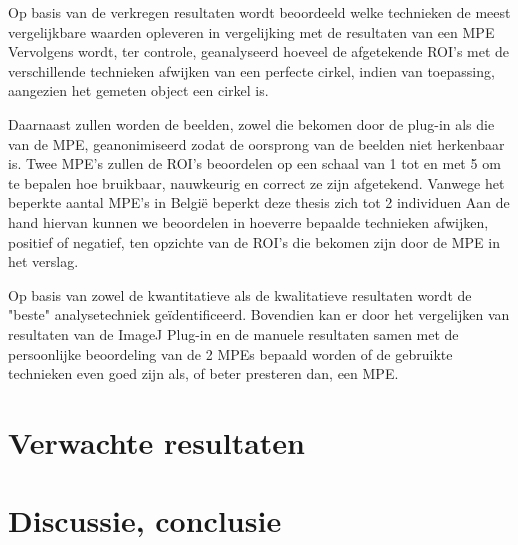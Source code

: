 \documentclass{hogent-article}
\begin{document}
Op basis van de verkregen resultaten wordt beoordeeld welke technieken de meest vergelijkbare waarden opleveren in vergelijking met de resultaten van een MPE Vervolgens wordt, ter controle,  geanalyseerd hoeveel de afgetekende ROI's met de verschillende technieken afwijken van een perfecte cirkel, indien van toepassing, aangezien het gemeten object  een cirkel is.

Daarnaast zullen worden de beelden, zowel die bekomen door de plug-in als die van de MPE, geanonimiseerd zodat de oorsprong van de beelden niet herkenbaar is. Twee MPE’s  zullen de ROI's beoordelen op een schaal van 1 tot en met 5 om te bepalen hoe bruikbaar, nauwkeurig en correct ze zijn afgetekend. Vanwege het beperkte aantal MPE’s  in België beperkt deze thesis zich tot 2 individuen Aan de hand hiervan kunnen we beoordelen in hoeverre bepaalde technieken afwijken, positief of negatief, ten opzichte van de ROI’s die bekomen zijn door de MPE in het verslag.

Op basis van zowel de kwantitatieve als de kwalitatieve resultaten wordt de "beste" analysetechniek geïdentificeerd. Bovendien kan er door het vergelijken van resultaten van de ImageJ Plug-in en de manuele resultaten samen met de persoonlijke beoordeling van de 2 MPEs bepaald worden  of de gebruikte technieken even goed zijn als, of beter presteren dan, een MPE.

\section{Verwachte resultaten}%
\label{sec:verwachte-resultaten}


\lipsum[14-18]

\section{Discussie, conclusie}%
\label{sec:discussie-conclusie}

\lipsum[19-21]


\printbibliography[heading=bibintoc]
\end{document}
